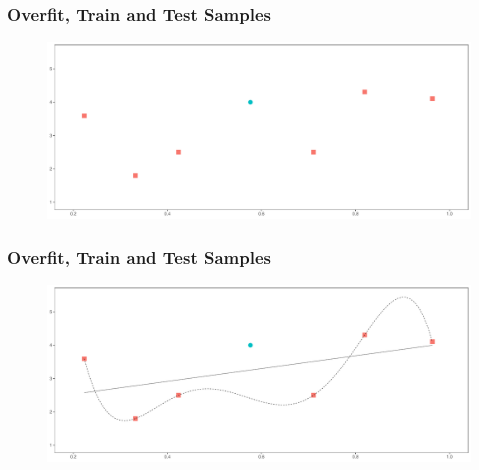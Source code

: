 \documentclass[
  shownotes,
  xcolor={svgnames},
  hyperref={colorlinks,citecolor=DarkBlue,linkcolor=DarkRed,urlcolor=DarkBlue}
  , aspectratio=169]{beamer}
\begin{document}
\begin{frame}
\frametitle{Overfit, Train and Test Samples}


        \begin{figure}[H] \centering
            \captionsetup{justification=centering}
              \includegraphics[scale=0.4]{figures/fig_1g.pdf}
 \end{figure}

\end{frame}

\begin{frame}
\frametitle{Overfit, Train and Test Samples}


        \begin{figure}[H] \centering
            \captionsetup{justification=centering}
              \includegraphics[scale=0.4]{figures/fig_1h.pdf}
 \end{figure}

\end{frame}
\end{document}
